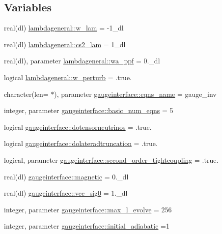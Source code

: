 \subsection*{Variables}
\begin{DoxyCompactItemize}
\item 
real(dl) \mbox{\hyperlink{namespacelambdageneral_aa974593ba987c77d2bf09655570fab6a}{lambdageneral\+::w\+\_\+lam}} = -\/1\+\_\+dl
\item 
real(dl) \mbox{\hyperlink{namespacelambdageneral_a5df860ac945ff458c8f809a63ea3987f}{lambdageneral\+::cs2\+\_\+lam}} = 1\+\_\+dl
\item 
real(dl), parameter \mbox{\hyperlink{namespacelambdageneral_a175aaf4fc2698fa3d615510feb82f3ee}{lambdageneral\+::wa\+\_\+ppf}} = 0.\+\_\+dl
\item 
logical \mbox{\hyperlink{namespacelambdageneral_aaccd65e521dd501c9ee6c8e77a95ffef}{lambdageneral\+::w\+\_\+perturb}} = .true.
\item 
character(len= $\ast$), parameter \mbox{\hyperlink{namespacegaugeinterface_a7ad176ccd8e025b00d5ae35428c6f894}{gaugeinterface\+::eqns\+\_\+name}} = \textquotesingle{}gauge\+\_\+inv\textquotesingle{}
\item 
integer, parameter \mbox{\hyperlink{namespacegaugeinterface_a4ec8e34555b9492e02f9ca7793b37b7a}{gaugeinterface\+::basic\+\_\+num\+\_\+eqns}} = 5
\item 
logical \mbox{\hyperlink{namespacegaugeinterface_a48d8dc2750f4cecf3337b6f6dd2d736b}{gaugeinterface\+::dotensorneutrinos}} = .true.
\item 
logical \mbox{\hyperlink{namespacegaugeinterface_a1c86dc449a45192d8e9e999627a3f511}{gaugeinterface\+::dolateradtruncation}} = .true.
\item 
logical, parameter \mbox{\hyperlink{namespacegaugeinterface_af060fa6622bea0f389dc0965bee8d67f}{gaugeinterface\+::second\+\_\+order\+\_\+tightcoupling}} = .true.
\item 
real(dl) \mbox{\hyperlink{namespacegaugeinterface_aaa26844a2740bc664b3c821e92dc6b52}{gaugeinterface\+::magnetic}} = 0.\+\_\+dl
\item 
real(dl) \mbox{\hyperlink{namespacegaugeinterface_ae547cea1b332095dd0c9b5a6c24466ae}{gaugeinterface\+::vec\+\_\+sig0}} = 1.\+\_\+dl
\item 
integer, parameter \mbox{\hyperlink{namespacegaugeinterface_a965f8caba9ba282e718281110e274b04}{gaugeinterface\+::max\+\_\+l\+\_\+evolve}} = 256
\item 
integer, parameter \mbox{\hyperlink{namespacegaugeinterface_ac5567a8b42e51ba563113652958ea70b}{gaugeinterface\+::initial\+\_\+adiabatic}} =1

\end{DoxyCompactItemize}
